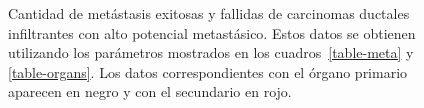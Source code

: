 \begin{figure}[p]
\begin{center}
{}\vspace*{-0.2cm}
\vspace*{-0.2cm}
\end{center}\vspace*{-0.6cm}
\caption[Cantidad de met\'astasis exitosas y fallidas de carcinomas ductales infiltrantes con alto potencial metast\'asico]{Cantidad de met\'astasis exitosas y fallidas de carcinomas ductales infiltrantes con alto potencial metast\'asico. Estos datos se obtienen utilizando los par\'ametros mostrados en los cuadros~\ref{table-meta} y \ref{table-organs}. Los datos correspondientes con el \'organo primario aparecen en negro y con el secundario en rojo.}
\label{graph-meta}
\end{figure}


